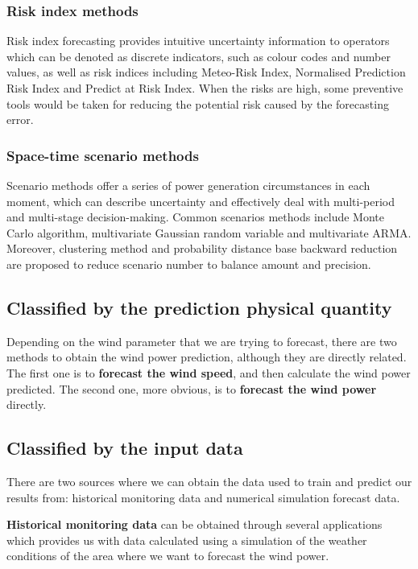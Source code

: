 \subsubsection{Risk index methods}

Risk index forecasting provides intuitive uncertainty information to operators which can be denoted as discrete indicators, such as colour codes and number values, as well as risk indices including Meteo-Risk Index, Normalised Prediction Risk Index and Predict at Risk Index. When the risks are high, some preventive tools would be taken for reducing the potential risk caused by the forecasting error.

\subsubsection{Space-time scenario methods}

Scenario methods offer a series of power generation circumstances in each moment, which can describe uncertainty and effectively deal with multi-period and multi-stage decision-making. Common scenarios methods include Monte Carlo algorithm, multivariate Gaussian random variable and multivariate ARMA. Moreover, clustering method and probability distance base backward reduction are proposed to reduce scenario number to balance amount and precision.

\subsection{Classified by the prediction physical quantity}

Depending on the wind parameter that we are trying to forecast, there are two methods to obtain the wind power prediction, although they are directly related. The first one is to \textbf{forecast the wind speed}, and then calculate the wind power predicted. The second one, more obvious, is to \textbf{forecast the wind power} directly.

\subsection{Classified by the input data}

There are two sources where we can obtain the data used to train and predict our results from: historical monitoring data and numerical simulation forecast data.

\textbf{Historical monitoring data} can be obtained through several applications which provides us with data calculated using a simulation of the weather conditions of the area where we want to forecast the wind power.

